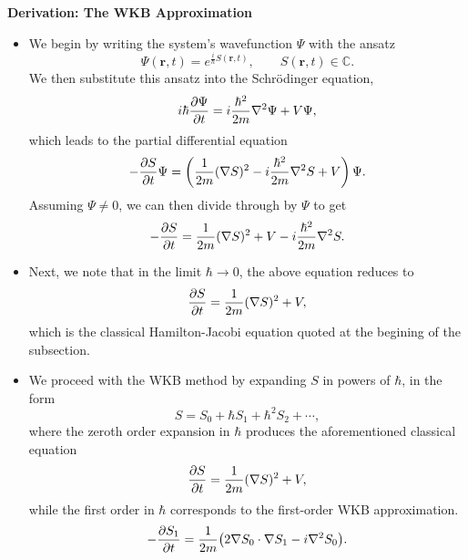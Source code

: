 \documentclass[11pt, a4paper]{article}
\renewcommand{\grad}{\nabla}
\renewcommand{\laplacian}{\nabla^{2}}
\newcommand{\Schro}{Schr\"{o}dinger\xspace}
\renewcommand{\vec}[1]{\bm{#1}}  %
\renewcommand{\r}{\vec{r}}  %
\begin{document}
\textbf{Derivation: The WKB Approximation}
\begin{itemize}
    \item We begin by writing the system's wavefunction $ \Psi $ with the ansatz 
    \begin{equation*}
        \Psi(\r, t) = e^{\frac{i}{\hbar}S(\r, t)}, \qquad S(\r, t) \in \mathbb{C}.
    \end{equation*}
    We then substitute this ansatz into the \Schro equation,
    \begin{equation*}
        i \hbar \pdv{\Psi}{t} = i \frac{\hbar^{2}}{2m}\laplacian \Psi + V \Psi,
    \end{equation*}
    which leads to the partial differential equation
    \begin{equation*}
        - \pdv{S}{t}\Psi = \left( \frac{1}{2m}(\grad S)^{2} - i \frac{\hbar^{2}}{2m} \laplacian S + V \right)\Psi.
    \end{equation*}
    Assuming $ \Psi \neq 0 $, we can then divide through by $ \Psi $ to get
    \begin{equation*}
        -\pdv{S}{t} = \frac{1}{2m}(\grad S)^{2} + V - i \frac{\hbar^{2}}{2m}\laplacian S.
    \end{equation*}
    
    \item Next, we note that in the limit $ \hbar \to 0 $, the above equation reduces to
    \begin{equation*}
        \pdv{S}{t} = \frac{1}{2m}(\grad S)^{2} + V,
    \end{equation*}
    which is the classical Hamilton-Jacobi equation quoted at the begining of the subsection.
    
    \item We proceed with the WKB method by expanding $ S $ in powers of $ \hbar $, in the form
    \begin{equation*}
        S = S_{0} + \hbar S_{1} + \hbar^{2}S_{2} + \cdots,
    \end{equation*}
    where the zeroth order expansion in $ \hbar $ produces the aforementioned classical equation
    \begin{equation*}
        \pdv{S}{t} = \frac{1}{2m}(\grad S)^{2} + V,
    \end{equation*}
    while the first order in $ \hbar $ corresponds to the first-order WKB approximation.
    \begin{equation*}
        - \pdv{S_{1}}{t} = \frac{1}{2m} \big( 2 \grad S_{0} \cdot \grad S_{1} - i \laplacian S_{0} \big).
    \end{equation*}

\end{itemize}
\end{document}
